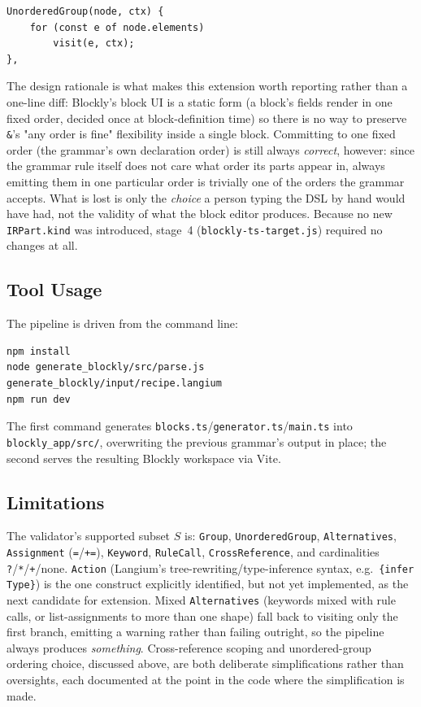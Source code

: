 \documentclass[runningheads]{llncs}
\begin{document}
\begin{lstlisting}[caption={The \texttt{UnorderedGroup} IR handler}, label=lst:unordered-handler]
UnorderedGroup(node, ctx) {
    for (const e of node.elements)
        visit(e, ctx);
},
\end{lstlisting}

The design rationale is what makes this extension worth reporting rather than a one-line diff: Blockly's block UI is a static form (a block's fields render in one fixed order, decided once at block-definition time) so there is no way to preserve \texttt{\&}'s "any order is fine" flexibility inside a single block. Committing to one fixed order (the grammar's own declaration order) is still always \emph{correct}, however: since the grammar rule itself does not care what order its parts appear in, always emitting them in one particular order is trivially one of the orders the grammar accepts. What is lost is only the \emph{choice} a person typing the DSL by hand would have had, not the validity of what the block editor produces. Because no new \texttt{IRPart.kind} was introduced, stage~4 (\texttt{blockly-ts-target.js}) required no changes at all.

\subsection{Tool Usage}
The pipeline is driven from the command line:
\begin{lstlisting}[caption=Generating and running an editor for a grammar]
npm install
node generate_blockly/src/parse.js generate_blockly/input/recipe.langium
npm run dev
\end{lstlisting}
The first command generates \texttt{blocks.ts}\slash\texttt{generator.ts}\slash\texttt{main.ts} into \texttt{blockly\_app\slash src\slash}, overwriting the previous grammar's output in place; the second serves the resulting Blockly workspace via Vite.

\subsection{Limitations}
\label{sec:limitations}
The validator's supported subset $S$ is: \texttt{Group}, \texttt{UnorderedGroup}, \texttt{Alternatives}, \texttt{Assignment} (\texttt{=}\slash\texttt{+=}), \texttt{Keyword}, \texttt{RuleCall}, \texttt{CrossReference}, and cardinalities \texttt{?}\slash\texttt{*}\slash\texttt{+}\slash none. \texttt{Action} (Langium's tree-rewriting/type-inference syntax, e.g.\ \texttt{\{infer Type\}}) is the one construct explicitly identified, but not yet implemented, as the next candidate for extension. Mixed \texttt{Alternatives} (keywords mixed with rule calls, or list-assignments to more than one shape) fall back to visiting only the first branch, emitting a warning rather than failing outright, so the pipeline always produces \emph{something}. Cross-reference scoping and unordered-group ordering choice, discussed above, are both deliberate simplifications rather than oversights, each documented at the point in the code where the simplification is made.
\end{document}
